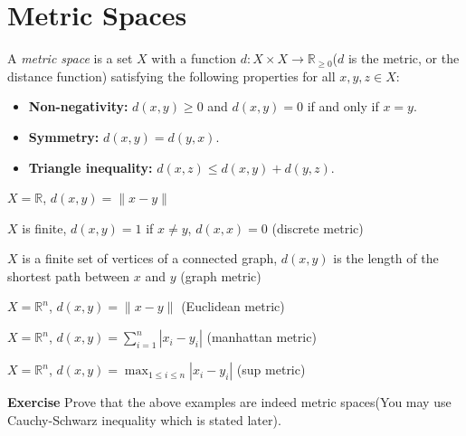 \documentclass[main.tex]{subfiles}
\begin{document}
\pagestyle{plain}
\setcounter{chapter}{0}

\chapter{Metric Spaces}
\label{chap:chapter1}

\begin{definition}
    A \emph{metric space} is a set $X$ with a function $d: X \times X \to \mathbb{R}_{\ge 0}$($d$ is the metric, or the distance function) satisfying the following properties for all $x, y, z \in X$: 
    \begin{itemize}
    \item \textbf{Non-negativity:} $d(x, y) \ge 0$ and $d(x, y) = 0$ if and only if $x = y$.
    \item \textbf{Symmetry:} $d(x, y) = d(y, x)$.
    \item \textbf{Triangle inequality:} $d(x, z) \le d(x, y) + d(y, z)$. 
\end{itemize}
\end{definition}

\begin{example}
    $X = \mathbb{R}$, $d(x, y) = \|x - y\|$ 
\end{example}

\begin{example}
    $X$ is finite, $d(x, y) = 1$ if $x \neq y$, $d(x, x) = 0$ (discrete metric)
\end{example}

\begin{example}
    $X$ is a finite set of vertices of a connected graph, $d(x, y)$ is the length of the shortest path between $x$ and $y$ (graph metric)
\end{example}

\begin{example}
    $X = \mathbb{R}^n$, $d(x, y) = \|x - y\|$ (Euclidean metric) 
\end{example}

\begin{example}
    $X = \mathbb{R}^n$, $d(x, y) = \sum_{i=1}^n |x_i - y_i|$ (manhattan metric)
\end{example}

\begin{example}
    $X = \mathbb{R}^n$, $d(x, y) = \max_{1 \le i \le n} |x_i - y_i|$ (sup metric)
\end{example}

\par \noindent \textbf{Exercise} Prove that the above examples are indeed metric spaces(You may use Cauchy-Schwarz inequality which is stated later). 
\end{document}
